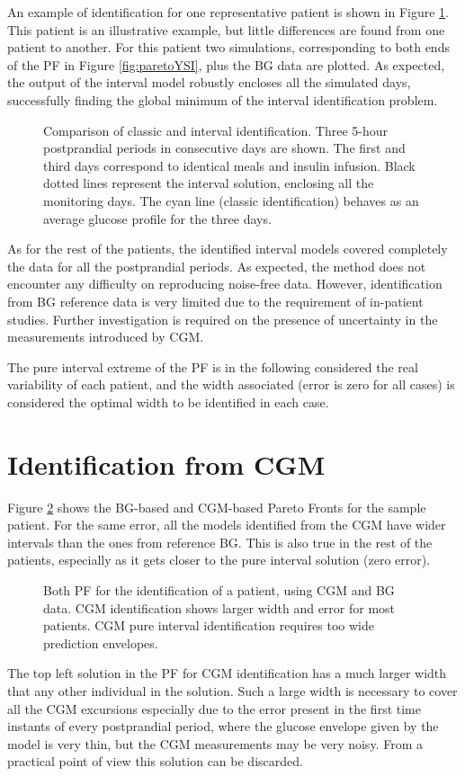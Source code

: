 An example of identification for one representative patient is shown in Figure \ref{fig:classicvsintervalYSI}. This patient is an illustrative example, but little differences are found from one patient to another. For this patient two simulations, corresponding to both ends of the PF in Figure \ref{fig:paretoYSI}, plus the BG data are plotted. As expected, the output of the interval model robustly encloses all the simulated days, successfully finding the global minimum of the interval identification problem.
\begin{figure}[hbt]
\centering
{}\caption{Comparison of classic and interval identification. Three 5-hour postprandial periods in consecutive days are shown. The first and third days correspond to identical meals and insulin infusion. Black dotted lines represent the interval solution, enclosing all the monitoring days. The cyan line (classic identification) behaves as an average glucose profile for the three days.}
\label{fig:classicvsintervalYSI}
\end{figure}
As for the rest of the patients, the identified interval models covered completely the data for all the postprandial periods. As expected, the method does not encounter any difficulty on reproducing noise-free data. However, identification from BG reference data is very limited due to the requirement of in-patient studies. Further investigation is required on the presence of uncertainty in the measurements introduced by CGM.

The pure interval extreme of the PF is in the following considered the real variability of each patient, and the width associated (error is zero for all cases) is considered the optimal width to be identified in each case.

\section{Identification from CGM}
\label{sec:IdentificationFromCGM}

Figure \ref{fig:YSIvsCGMpareto} shows the BG-based and CGM-based Pareto Fronts for the sample patient. For the same error, all the models identified from the CGM have wider intervals than the ones from reference BG. This is also true in the rest of the patients, especially as it gets closer to the pure interval solution (zero error). 
\begin{figure}[hbt]
\centering
{}\caption{Both PF for the identification of a patient, using CGM and BG data. CGM identification shows larger width and error for most patients. CGM pure interval identification requires too wide prediction envelopes.}
\label{fig:YSIvsCGMpareto}
\end{figure}
The top left solution in the PF for CGM identification has a much larger width that any other individual in the solution. Such a large width is necessary to cover all the CGM excursions especially due to the error present in the first time instants of every postprandial period, where the glucose envelope given by the model is very thin, but the CGM measurements may be very noisy. From a practical point of view this solution can be discarded.

